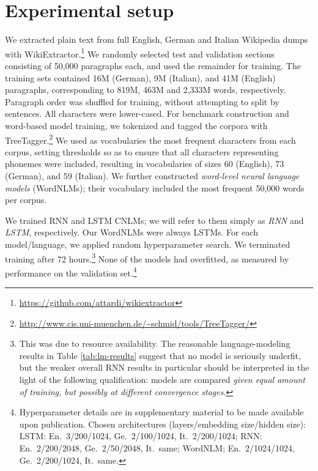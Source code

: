 \section{Experimental setup}
\label{sec:setup}

We extracted plain text from full English, German and Italian
Wikipedia dumps with
WikiExtractor.\footnote{\url{https://github.com/attardi/wikiextractor}}
We randomly selected test and validation sections consisting of 50,000
paragraphs each, and used the remainder for training. The training
sets contained 16M (German), 9M (Italian), and 41M (English)
paragraphs, corresponding to 819M, 463M and 2,333M words,
respectively. Paragraph order was shuffled for training, without
attempting to split by sentences. All characters were lower-cased.
For benchmark construction and word-based model training, we tokenized
and tagged the corpora with
TreeTagger.\footnote{\url{http://www.cis.uni-muenchen.de/~schmid/tools/TreeTagger/}}
We used as vocabularies the most frequent characters from each corpus,
setting thresholds so as to ensure that all characters representing
phonemes were included, resulting in vocabularies of sizes 60
(English), 73 (German), and 59 (Italian).  We further constructed
\emph{word-level neural language models} (WordNLMs); their vocabulary
included the most frequent 50,000 words per corpus.

We trained RNN and LSTM CNLMs; we will refer to them simply as
\emph{RNN} and \emph{LSTM}, respectively. Our WordNLMs were always
LSTMs.  For each model/language, we applied random hyperparameter
search.  We terminated training after 72 hours.\footnote{This was
  due to resource availability. The reasonable
  language-modeling results in Table \ref{tab:lm-results} suggest that
  no model is seriously underfit, but the weaker overall RNN results
  in particular should be interpreted in the light of the following qualification:  models are compared \emph{given equal amount of training, but
    possibly at different convergence stages}.} None of
the models had overfitted, as measured by performance on the
validation set.\footnote{Hyperparameter details are in supplementary material to be made
  available upon publication. Chosen architectures (layers/embedding size/hidden size): LSTM: En.~3/200/1024, Ge.~2/100/1024, It.~2/200/1024; RNN: En.~2/200/2048, Ge.~2/50/2048, It.~same; WordNLM; En.~2/1024/1024, Ge.~2/200/1024, It.~same.}

